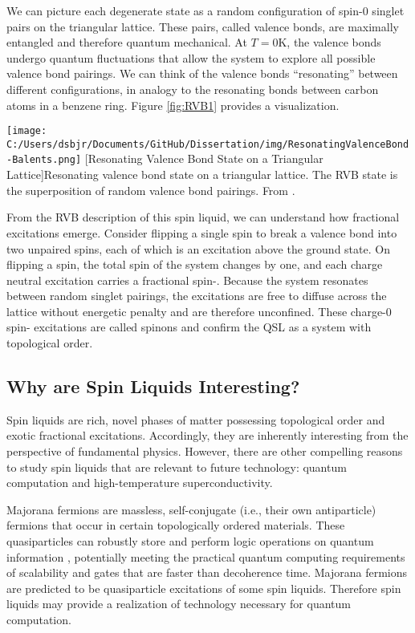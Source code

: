 We can picture each degenerate state as a random configuration of spin-0 singlet pairs on the triangular lattice. These pairs, called valence bonds, are maximally entangled and therefore quantum mechanical. At $T = 0$K, the valence bonds undergo quantum fluctuations that allow the system to explore all possible valence bond pairings. We can think of the valence bonds ``resonating'' between different configurations, in analogy to the resonating bonds between carbon atoms in a benzene ring. Figure \ref{fig:RVB1} provides a visualization.

\begin{centering}
\texttt{[image: C:/Users/dsbjr/Documents/GitHub/Dissertation/img/ResonatingValenceBond-Balents.png]}
  \captionsetup{width=0.75\textwidth}
  [Resonating Valence Bond State on a Triangular Lattice]{Resonating valence bond state on a triangular lattice. The RVB state is the superposition of random valence bond pairings. From \cite{Balents2010}.}
  \label{fig:RVB1}
\end{centering}

From the RVB description of this spin liquid, we can understand how fractional excitations emerge. Consider flipping a single spin to break a valence bond into two unpaired spins, each of which is an excitation above the ground state. On flipping a spin, the total spin of the system changes by one, and each charge neutral excitation carries a fractional spin-\textonehalf{}. Because the system resonates between random singlet pairings, the excitations are free to diffuse across the lattice without energetic penalty and are therefore unconfined. These charge-0 spin-\textonehalf{} excitations are called spinons and confirm the QSL as a system with topological order.

\subsection{Why are Spin Liquids Interesting?}

Spin liquids are rich, novel phases of matter possessing topological order and exotic fractional excitations. Accordingly, they are inherently interesting from the perspective of fundamental physics. However, there are other compelling reasons to study spin liquids that are relevant to future technology: quantum computation and high-temperature superconductivity. 

Majorana fermions are massless, self-conjugate (i.e., their own antiparticle) fermions that occur in certain topologically ordered materials. These quasiparticles can robustly store and perform logic operations on quantum information \cite{Lian2017}, potentially meeting the practical quantum computing requirements of scalability and gates that are faster than decoherence time. Majorana fermions are predicted to be quasiparticle excitations of some spin liquids. Therefore spin liquids may provide a realization of technology necessary for quantum computation.

